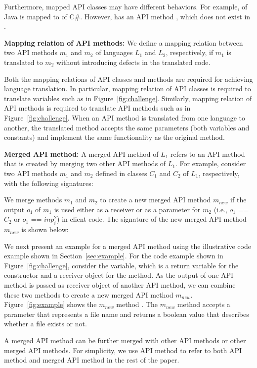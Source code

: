 Furthermore, mapped API classes may have different behaviors. For
example,  of Java is mapped to
 of C\#. However,  has
an API method , which does not exist in
.

\textbf{Mapping relation of API methods:} We define a mapping relation
between two API methods $m_1$ and $m_2$ of languages $L_1$ and $L_2$,
respectively, if $m_1$ is translated to $m_2$ without introducing defects
in the translated code.

Both the mapping relations of API classes and methods are required
for achieving language translation. In particular, mapping relation
of API classes is required to translate variables such as
 in Figure~\ref{fig:challenge}. Similarly, mapping
relation of API methods is required to translate API methods such as
 in Figure~\ref{fig:challenge}. When an API method is
translated from one language to another, the translated method
accepts the same parameters (both variables and constants) and
implement the same functionality as the original method.

\textbf{Merged API method:} A merged API method of $L_1$ refers to
an API method that is created by merging two other API methods of
$L_1$. For example, consider two API methods $m_1$ and $m_2$ defined
in classes $C_1$ and $C_2$ of $L_1$, respectively, with the
following signatures:



We merge methods $m_1$ and $m_2$ to create a new merged API method $m_{new}$ if the
output $o_1$ of $m_1$ is used either as a receiver or as a
parameter for $m_2$ (i.e., $o_1$ == $C_2$ or $o_1$ == $inp_i^2$)
in client code. The signature of the new merged API method $m_{new}$ is
shown below:


We next present an example for a merged API method using the
illustrative code example shown in Section~\ref{sec:example}. For
the code example shown in Figure~\ref{fig:challenge}, consider the
 variable, which is a return variable for the
constructor and a receiver object for the  method. As
the output of one API method is passed as receiver object of another
API method, we can combine these two methods to create a new merged
API method $m_{new}$. Figure~\ref{fig:example} shows the $m_{new}$
method . The $m_{new}$ method
accepts a  parameter that represents a file name and
returns a boolean value that describes whether a file exists or not.

A merged API method can be further merged with other API methods or
other merged API methods. For simplicity, we use API method to refer
to both API method and merged API method in the rest of the paper.
